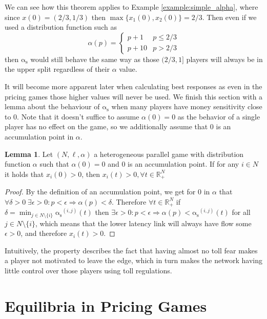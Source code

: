 \documentclass[10pt,a4paper]{book}
\newcommand{\as}{\mathrm{\alpha_s}}
\newcommand{\R}{\mathbb{R}}
\theoremstyle{definition}
\newtheorem{lemma}[definition]{Lemma}
\theoremstyle{comment}
\begin{document}
We can see how this theorem applies to Example \ref{example:simple_alpha}, where since $x(0) = (2/3, 1/3)$ then $\max\{x_1(0), x_2(0)\} = 2/3$.
Then even if we used a distribution function such as
\[
	\alpha(p) =
	\begin{cases}
		p + 1 & p \le 2/3 \\
		p + 10 & p > 2/3
	\end{cases}
\]
then $\as$ would still behave the same way as those $(2/3, 1]$ players will always be in the upper split regardless of their $\alpha$ value.

It will become more apparent later when calculating best responses as even in the pricing games those higher values will never be used.
We finish this section with a lemma about the behaviour of $\as$ when many players have money sensitivity close to 0.
Note that it doesn't suffice to assume $\alpha(0) = 0$ as the behavior of a single player has no effect on the game, so we additionally assume that $0$ is an accumulation point in $\alpha$.
\begin{lemma}
	Let $(N, \ell, \alpha)$ a heterogeneous parallel game with distribution function $\alpha$ such that $\alpha(0) = 0$ and $0$ is an accumulation point.
	If for any $i \in N$ it holds that $x_i(0) > 0$, then $x_i(t) > 0, \forall t \in \R_+^N$
\end{lemma}

\begin{proof}
	By the definition of an accumulation point, we get for $0$ in $\alpha$ that $\forall \delta > 0 \; \exists \epsilon > 0: p < \epsilon \Rightarrow \alpha(p) < \delta$.
	Therefore $\forall t \in \R_+^N$ if $\delta = \min_{j \in N \setminus \{i\}}\as^{(i, j)}(t)$ then $\exists \epsilon > 0: p < \epsilon \Rightarrow \alpha(p) < \as^{(i, j)}(t)$ for all $j \in N \setminus \{i\}$, which means that the lower latency link will always have flow some $\epsilon > 0$, and therefore $x_i(t) > 0$.
\end{proof}
Intuitively, the property describes the fact that having almost no toll fear makes a player not motivated to leave the edge, which in turn makes the network having little control over those players using toll regulations.

\cleardoublepage


\chapter{Equilibria in Pricing Games}
\label{chapter:pricing_equilibria}
\end{document}
